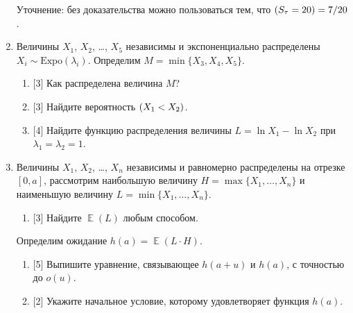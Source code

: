 \documentclass[12pt]{article}
\DeclareMathOperator{\Var}{\mathbb{V}ar}
\let\P\relax
\DeclareMathOperator{\P}{\mathbb{P}}
\DeclareMathOperator{\E}{\mathbb{E}}
\newcommand \NN{\mathbb{N}}
\newcommand{\dExpo}{\mathrm{Expo}}
\newcommand{\dGamma}{\mathrm{Gamma}}
\begin{document}
\begin{enumerate}
    Уточнение: без доказательства можно пользоваться тем, что $\P(S_\tau = 20) = 7/20$.



    
    \newpage

    \item Величины $X_1$, $X_2$, \dots, $X_5$ независимы и экспоненциально распределены $X_i \sim \dExpo(\lambda_i)$.
    Определим  $M = \min\{X_3, X_4, X_5\}$.
    \begin{enumerate}
        \item {[3]} Как распределена величина $M$?
        \item {[3]} Найдите вероятность $\P(X_1 < X_2)$.
        \item {[4]} Найдите функцию распределения величины $L = \ln X_1 - \ln X_2$ при $\lambda_1 = \lambda_2 = 1$.
    \end{enumerate}

    \item Величины $X_1$, $X_2$, \dots, $X_n$ независимы и равномерно распределены на отрезке $[0, a]$,
    рассмотрим наибольшую величину $H = \max\{X_1, \dots, X_n\}$ и наименьшую величину $L = \min\{X_1, \dots, X_n\}$.
    \begin{enumerate}
        \item {[3]} Найдите $\E(L)$ любым способом. 
    \end{enumerate}
    Определим ожидание $h(a) = \E(L \cdot H)$.
    \begin{enumerate}[resume]
        \item {[5]} Выпишите уравнение, связывающее $h(a + u)$ и $h(a)$, с точностью до $o(u)$.
        \item {[2]} Укажите начальное условие, которому удовлетворяет функция $h(a)$.
    \end{enumerate}

    
\end{enumerate}
\end{document}
